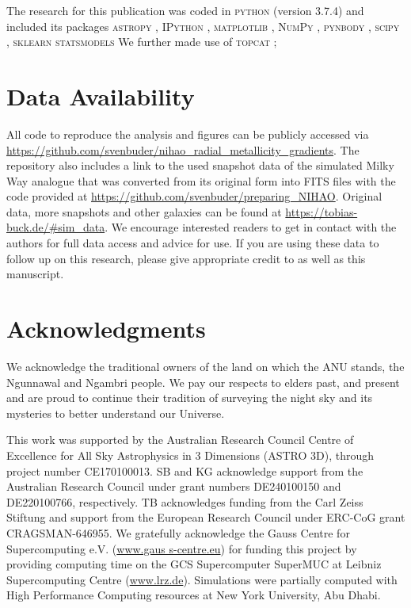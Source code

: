 \documentclass[twocolumn,apj,numberedappendix,appendixfloats,twocolappendix]{openjournal}
\begin{document}
\begin{CJK*}{UTF8}{gbsn}
The research for this publication was coded in \textsc{python} (version 3.7.4) and included its packages
\textsc{astropy} \citep[v. 3.2.2;][]{Robitaille2013,PriceWhelan2018},
\textsc{IPython} \citep[v. 7.8.0;][]{ipython},
\textsc{matplotlib} \citep[v. 3.1.3;][]{matplotlib},
\textsc{NumPy} \citep[v. 1.17.2;][]{numpy},
\textsc{pynbody} \citep[v. 1.1.0;][]{pynbody},
\textsc{scipy} \citep[v. 1.3.1;][]{Scipy},
\textsc{sklearn} \citep[v. 1.5.1][]{scikit-learn}
\textsc{statsmodels} \citep[v. 0.14.2][]{statsmodels}
We further made use of \textsc{topcat} \citep[version 4.7;][]{Taylor2005};

\section*{Data Availability}

All code to reproduce the analysis and figures can be publicly accessed via \url{https://github.com/svenbuder/nihao_radial_metallicity_gradients}. The repository also includes a link to the used snapshot data of the simulated Milky Way analogue that was converted from its original form into FITS files with the code provided at \url{https://github.com/svenbuder/preparing_NIHAO}. Original data, more snapshots and other galaxies can be found at \url{https://tobias-buck.de/#sim_data}. We encourage interested readers to get in contact with the authors for full data access and advice for use. If you are using these data to follow up on this research, please give appropriate credit to \citet{Buck2020b, Buck2021} as well as this manuscript.

\section*{Acknowledgments}

We acknowledge the traditional owners of the land on which the ANU stands, the Ngunnawal and Ngambri people. We pay our respects to elders past, and present and are proud to continue their tradition of surveying the night sky and its mysteries to better understand our Universe.

This work was supported by the Australian Research Council Centre of Excellence for All Sky Astrophysics in 3 Dimensions (ASTRO 3D), through project number CE170100013. SB and KG acknowledge support from the Australian Research Council under grant numbers DE240100150 and DE220100766, respectively. TB acknowledges funding from the Carl Zeiss Stiftung and support from the European Research Council under ERC-CoG grant CRAGSMAN-646955. We gratefully acknowledge the Gauss Centre for Supercomputing e.V. (\url{www.gaus s-centre.eu}) for funding this project by providing computing time on the GCS Supercomputer SuperMUC at Leibniz Supercomputing Centre (\url{www.lrz.de}). Simulations were partially computed with High Performance Computing resources at New York University, Abu Dhabi.


\end{CJK*}
\end{document}

